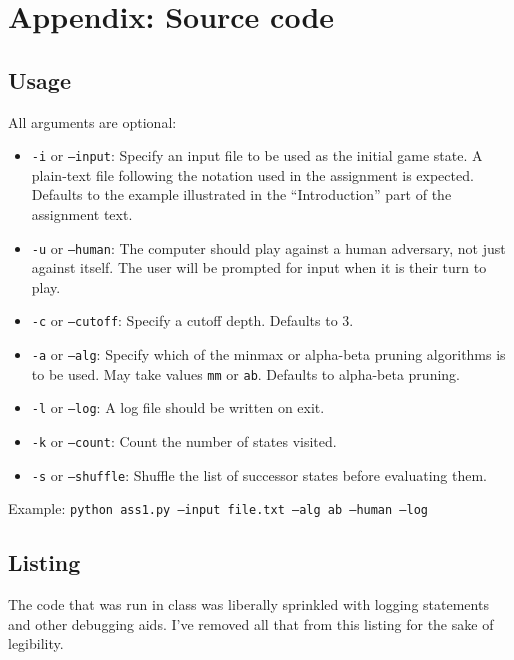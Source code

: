 \documentclass[letterpaper, 12pt]{article}
\numberwithin{theorem}{section}
\begin{document}
\clearpage
\appendix
\section{Appendix: Source code}

\subsection{Usage}
All arguments are optional:
\begin{itemize}
	\item \texttt{-i} or \texttt{--input}: Specify an input file to be used as the initial game state. A plain-text file following the notation used in the assignment is expected. Defaults to the example illustrated in the ``Introduction'' part of the assignment text.
	\item \texttt{-u} or \texttt{--human}: The computer should play against a human adversary, not just against itself. The user will be prompted for input when it is their turn to play.
	\item \texttt{-c} or \texttt{--cutoff}: Specify a cutoff depth. Defaults to 3.
	\item \texttt{-a} or \texttt{--alg}: Specify which of the minmax or alpha-beta pruning algorithms is to be used. May take values \texttt{mm} or \texttt{ab}. Defaults to alpha-beta pruning.
	\item \texttt{-l} or \texttt{--log}: A log file should be written on exit.
	\item \texttt{-k} or \texttt{--count}: Count the number of states visited.
	\item \texttt{-s} or \texttt{--shuffle}: Shuffle the list of successor states before evaluating them. 
\end{itemize}
Example: \texttt{python ass1.py --input file.txt --alg ab --human --log}

\subsection{Listing}
The code that was run in class was liberally sprinkled with logging statements and other debugging aids. I've removed all that from this listing for the sake of legibility.

\end{document}
